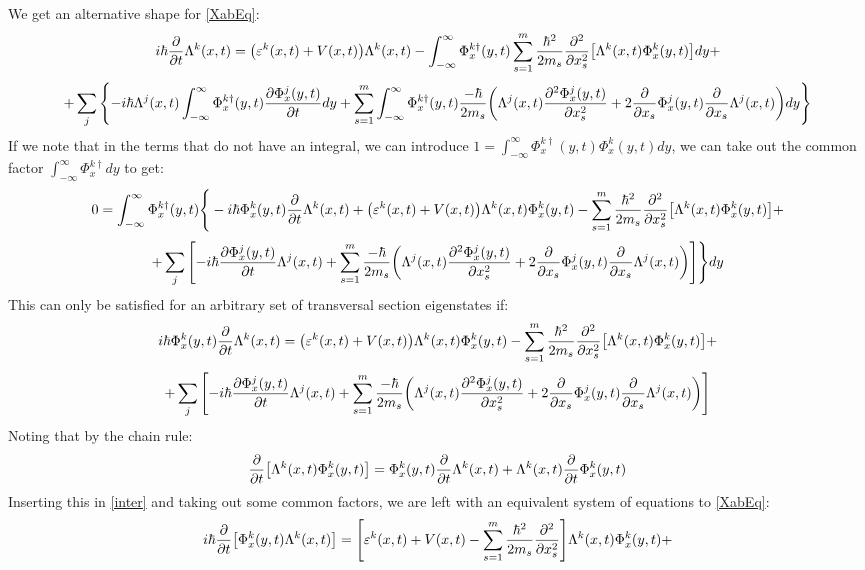 \documentclass[11pt, a4paper]{article} %
\begin{document}
We get an alternative shape for \eqref{XabEq}:
\begin{equation}
i\hbar \pdv{}{t}\Lambda^k(x,t)=\qty( \varepsilon^k(x,t)+V(x,t) )\Lambda^k(x,t) -\int_{-\infty}^\infty \Phi^{k\dagger}_x(y,t) \sum_{s=1}^m\frac{\hbar^2}{2m_s}\pdv[2]{}{x_s}\qty[\Lambda^k(x,t)\Phi^k_x(y,t) ]dy+
\end{equation}
$$
+\sum_j\qty{-i\hbar \Lambda^j(x,t)\int_{-\infty}^\infty \Phi^{k\dagger}_x(y,t)\pdv{\Phi^j_x(y,t)}{t}dy+\sum_{s=1}^m\int_{-\infty}^\infty \Phi^{k\dagger}_x(y,t) \frac{-\hbar}{2m_s}\qty( \Lambda^j(x,t)\pdv[2]{\Phi^j_x(y,t)}{x_s}+2\pdv{}{x_s}\Phi^j_x(y,t)\pdv{}{x_s}\Lambda^j(x,t) ) dy}
$$
If we note that in the terms that do not have an integral, we can introduce $1=\int_{-\infty}^\infty \Phi^{k\dagger}_x(y,t) \Phi^k_x(y,t)dy$, we can take out the common factor $\int_{-\infty}^\infty\Phi^{k\dagger}_x dy$ to get:
\begin{equation}
0=\int_{-\infty}^\infty\Phi^{k\dagger}_x(y,t)\Bigg\{ -i\hbar \Phi^k_x(y,t)\pdv{}{t}\Lambda^k(x,t)+\qty( \varepsilon^k(x,t)+V(x,t) )\Lambda^k(x,t)\Phi^k_x(y,t) -\sum_{s=1}^m\frac{\hbar^2}{2m_s}\pdv[2]{}{x_s}\qty[\Lambda^k(x,t)\Phi^k_x(y,t) ]+
\end{equation}
$$
+\sum_j\qty[-i\hbar \pdv{\Phi^j_x(y,t)}{t}\Lambda^j(x,t)+\sum_{s=1}^m \frac{-\hbar}{2m_s}\qty( \Lambda^j(x,t)\pdv[2]{\Phi^j_x(y,t)}{x_s}+2\pdv{}{x_s}\Phi^j_x(y,t)\pdv{}{x_s}\Lambda^j(x,t) ) ]\Bigg\}dy
$$
This can only be satisfied for an arbitrary set of transversal section eigenstates if:
\begin{equation}\label{inter}
 i\hbar \Phi^k_x(y,t)\pdv{}{t}\Lambda^k(x,t)=\qty( \varepsilon^k(x,t)+V(x,t) )\Lambda^k(x,t)\Phi^k_x(y,t) -\sum_{s=1}^m\frac{\hbar^2}{2m_s}\pdv[2]{}{x_s}\qty[\Lambda^k(x,t)\Phi^k_x(y,t) ]+
\end{equation}
$$
+\sum_j\qty[-i\hbar \pdv{\Phi^j_x(y,t)}{t}\Lambda^j(x,t)+\sum_{s=1}^m \frac{-\hbar}{2m_s}\qty( \Lambda^j(x,t)\pdv[2]{\Phi^j_x(y,t)}{x_s}+2\pdv{}{x_s}\Phi^j_x(y,t)\pdv{}{x_s}\Lambda^j(x,t) ) ]
$$
Noting that by the chain rule:
\begin{equation}
\pdv{}{t}\qty[\Lambda^k(x,t)\Phi^k_x(y,t)]=\Phi^k_x(y,t)\pdv{}{t}\Lambda^k(x,t)+\Lambda^k(x,t)\pdv{}{t}\Phi^k_x(y,t)
\end{equation}
Inserting this in \eqref{inter} and taking out some common factors, we are left with an equivalent system of equations to \eqref{XabEq}:
\begin{equation}\label{inter2}
 i\hbar\pdv{}{t}\qty[ \Phi^k_x(y,t)\Lambda^k(x,t)]=\qty[ \varepsilon^k(x,t)+V(x,t)  -\sum_{s=1}^m\frac{\hbar^2}{2m_s}\pdv[2]{}{x_s} ]\Lambda^k(x,t)\Phi^k_x(y,t)+
\end{equation}
\end{document}
